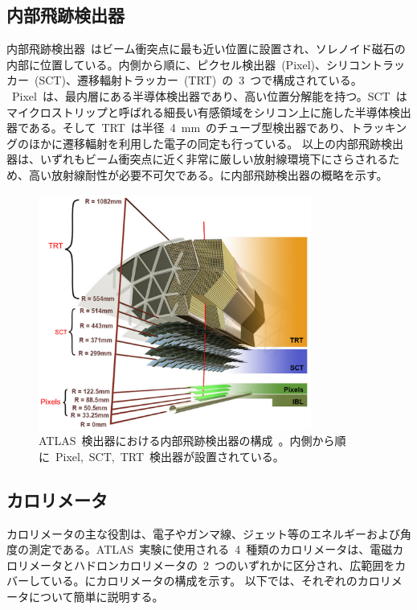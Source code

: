 \subsection{内部飛跡検出器}
内部飛跡検出器~\cite{URL:19}はビーム衝突点に最も近い位置に設置され、ソレノイド磁石の内部に位置している。内側から順に、ピクセル検出器~(Pixel)、シリコントラッカー~(SCT)、遷移輻射トラッカー~(TRT)~の~3~つで構成されている。
~Pixel~は、最内層にある半導体検出器であり、高い位置分解能を持つ。SCT~はマイクロストリップと呼ばれる細長い有感領域をシリコン上に施した半導体検出器である。そして~TRT~は半径~4~mm~のチューブ型検出器であり、トラッキングのほかに遷移輻射を利用した電子の同定も行っている。
以上の内部飛跡検出器は、いずれもビーム衝突点に近く非常に厳しい放射線環境下にさらされるため、高い放射線耐性が必要不可欠である。に内部飛跡検出器の概略を示す。

\begin{figure}[H]
    \centering   
    \includegraphics[width=0.8\textwidth,page=1]{img/jpeg/id.pdf}
    \caption[ATLAS~検出器における内部飛跡検出器の構成]{ATLAS~検出器における内部飛跡検出器の構成~\cite{URL:19}。内側から順に~Pixel,~SCT,~TRT~検出器が設置されている。}\label{fig:innr}
\end{figure}

\subsection{カロリメータ}
カロリメータの主な役割は、電子やガンマ線、ジェット等のエネルギーおよび角度の測定である。ATLAS~実験に使用される~4~種類のカロリメータは、電磁カロリメータとハドロンカロリメータの~2~つのいずれかに区分され、広範囲をカバーしている。にカロリメータの構成を示す。
以下では、それぞれのカロリメータについて簡単に説明する。

